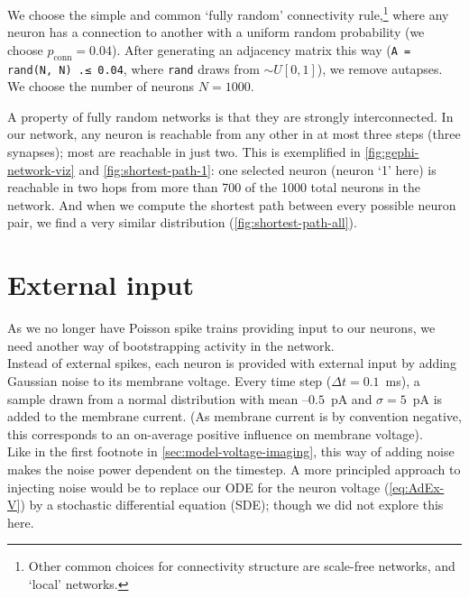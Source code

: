 
We choose the simple and common `fully random' connectivity rule,\footnote{
    Other common choices for connectivity structure are scale-free networks, and `local' networks.
}
where any neuron has a connection to another with a uniform random probability (we choose $p_\text{conn} = 0.04$). After generating an adjacency matrix this way (\verb|A = rand(N, N) .≤ 0.04|, where \verb|rand| draws from $\sim U[0,1]$), we remove autapses. We choose the number of neurons $N = 1000$.

A property of fully random networks is that they are strongly interconnected. In our network, any neuron is reachable from any other in at most three steps (three synapses); most are reachable in just two. This is exemplified in \cref{fig:gephi-network-viz} and \cref{fig:shortest-path-1}: one selected neuron (neuron `1' here) is reachable in two hops from more than 700 of the 1000 total neurons in the network. And when we compute the shortest path between every possible neuron pair, we find a very similar distribution (\cref{fig:shortest-path-all}).




\section{External input}

As we no longer have Poisson spike trains providing input to our neurons, we need another way of bootstrapping activity in the network.\\
Instead of external spikes, each neuron is provided with external input by adding Gaussian noise to its membrane voltage. Every time step ($Δt = 0.1$~ms), a sample drawn from a normal distribution with mean $–0.5$~pA and $σ = 5$~pA is added to the membrane current. (As membrane current is by convention negative, this corresponds to an on-average positive influence on membrane voltage).\\
Like in the first footnote in \cref{sec:model-voltage-imaging}, this way of adding noise makes the noise power dependent on the timestep. A more principled approach to injecting noise would be to replace our ODE for the neuron voltage (\cref{eq:AdEx-V}) by a stochastic differential equation (SDE); though we did not explore this here.


